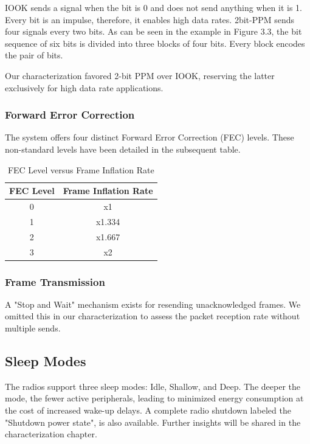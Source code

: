 IOOK sends a signal when the bit is 0 and does not send anything when it is 1. Every bit is an impulse, therefore, it enables high data rates. 2bit-PPM sends four signals every two bits. As can be seen in the example in Figure 3.3, the bit sequence of six bits is divided into three blocks of four bits. Every block encodes the pair of bits.

Our characterization favored 2-bit PPM over IOOK, reserving the latter exclusively for high data rate applications.

\subsubsection{Forward Error Correction}
The system offers four distinct Forward Error Correction (FEC) levels. These non-standard levels have been detailed in the subsequent table.

\begin{table}[htbp]
\centering
\begin{tabular}{|c|c|}
\hline
FEC Level & Frame Inflation Rate \\
\hline
0 & x1 \\
\hline
1 & x1.334 \\
\hline
2 & x1.667 \\
\hline
3 & x2 \\
\hline
\end{tabular}
\caption{FEC Level versus Frame Inflation Rate} %
\end{table}

\subsubsection{Frame Transmission}
A "Stop and Wait" mechanism exists for resending unacknowledged frames. We omitted this in our characterization to assess the packet reception rate without multiple sends.


\subsection{Sleep Modes}
The radios support three sleep modes: Idle, Shallow, and Deep. The deeper the mode, the fewer active peripherals, leading to minimized energy consumption at the cost of increased wake-up delays. A complete radio shutdown labeled the "Shutdown power state", is also available. Further insights will be shared in the characterization chapter.

